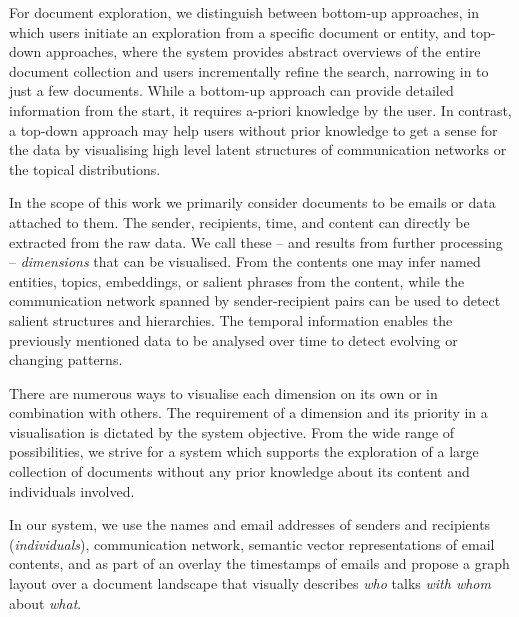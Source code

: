 For document exploration, we distinguish between bottom-up approaches, in which users initiate an exploration from a specific document or entity, and top-down approaches, where the system provides abstract overviews of the entire document collection and users incrementally refine the search, narrowing in to just a few documents.
While a bottom-up approach can provide detailed information from the start, it requires a-priori knowledge by the user.
In contrast, a top-down approach may help users without prior knowledge to get a sense for the data by visualising high level latent structures of communication networks or the topical distributions.

In the scope of this work we primarily consider documents to be emails or data attached to them.
The sender, recipients, time, and content can directly be extracted from the raw data.
We call these -- and results from further processing -- \textit{dimensions} that can be visualised.
From the contents one may infer named entities, topics, embeddings, or salient phrases from the content, while the communication network spanned by sender-recipient pairs can be used to detect salient structures and hierarchies.
The temporal information enables the previously mentioned data to be analysed over time to detect evolving or changing patterns.

There are numerous ways to visualise each dimension on its own or in combination with others.
The requirement of a dimension and its priority in a visualisation is dictated by the system objective.
From the wide range of possibilities, we strive for a system which supports the exploration of a large collection of documents without any prior knowledge about its content and individuals involved.

In our system, we use the names and email addresses of senders and recipients (\textit{individuals}), communication network, semantic vector representations of email contents, and as part of an overlay the timestamps of emails and propose a graph layout over a document landscape that visually describes \textit{who} talks \textit{with whom} about \textit{what}. 

